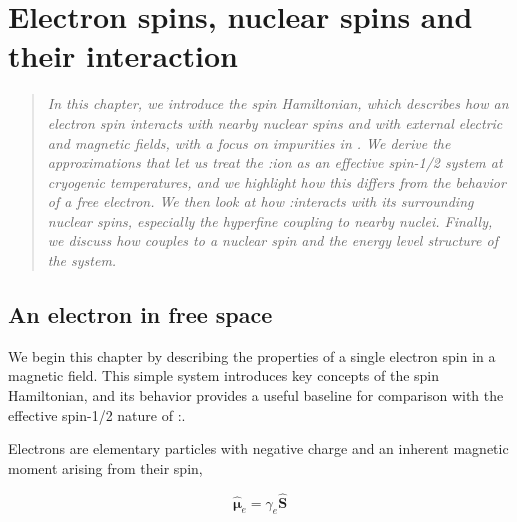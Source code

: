 \setchapterpreamble[u]{\margintoc}
\chapter{Electron spins, nuclear spins and their interaction}

\begin{quote}
\itshape
In this chapter, we introduce the spin Hamiltonian, which describes how an electron spin interacts with nearby nuclear spins and with external electric and magnetic fields, with a focus on \Er impurities in \Ca. We derive the approximations that let us treat the \Er:\Ca ion as an effective spin-1/2 system at cryogenic temperatures, and we highlight how this differs from the behavior of a free electron. We then look at how \Er:\Ca interacts with its surrounding nuclear spins, especially the hyperfine coupling to nearby \W nuclei. Finally, we discuss how \Er couples to a \Nb nuclear spin and the energy level structure of the system.
\end{quote}



\section{An electron in free space}

We begin this chapter by describing the properties of a single electron spin in a magnetic field. This simple system introduces key concepts of the spin Hamiltonian, and its behavior provides a useful baseline for comparison with the effective spin-1/2 nature of \Er:\Ca. 

Electrons are elementary particles with negative charge and an inherent magnetic moment arising from their spin,

\begin{equation}
    \hat{\boldsymbol{\mu}}_e = \gamma_e \hat{\mathbf{S}} 
\end{equation}

